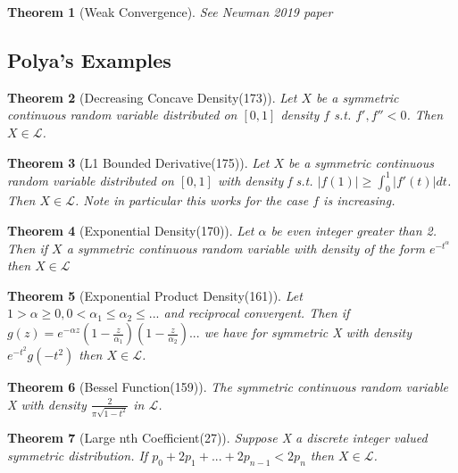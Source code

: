 \documentclass[10pt]{article}
\newcommand{\1}{\textbf{1}}
\newcommand{\lL}{\mathcal{L}}
\newtheorem{theorem}{Theorem}
\theoremstyle{remark}
\theoremstyle{definition}
\begin{document}
\begin{theorem}[Weak Convergence] \label{them:WC}
	See Newman 2019 paper
\end{theorem}

\subsection{Polya's Examples}

\begin{theorem}[Decreasing Concave Density(173)] \label{CCDNSTY}
	Let $X$ be a symmetric continuous random variable distributed on $[0,1]$ density $f$ s.t. $f',f'' < 0$. Then $X \in \lL$.
\end{theorem}

\begin{theorem}[L1 Bounded Derivative(175)] \label{LBDER}
	Let $X$ be a symmetric continuous random variable distributed on $[0,1]$ with density f s.t. $|f(1)| \geq \int_0^1 |f'(t)|dt$. Then $X \in \lL$. Note in particular this works for the case $f$ is increasing.
\end{theorem}

\begin{theorem}[Exponential Density(170)] \label{EXPDEN}
	Let $\alpha$ be even integer greater than 2. Then if $X$ a symmetric continuous random variable with density of the form $e^{-t^{\alpha}}$ then $X \in \lL$
\end{theorem}

\begin{theorem}[Exponential Product Density(161)] \label{EXPPDEN}
	Let $1 > \alpha \geq 0, 0 < \alpha_1 \leq \alpha_2 \leq ...$ and reciprocal convergent. Then if $g(z)= e^{-\alpha z} (1-\frac{z}{\alpha_1})(1-\frac{z}{\alpha_2})...$ we have for symmetric X with density $e^{-t^2} g(-t^2)$ then $X \in \lL$.
\end{theorem}

\begin{theorem}[Bessel Function(159)] \label{BF}
	The symmetric continuous random variable X with density $\frac{2}{\pi\sqrt{1-t^2}}$ in $\lL$.
\end{theorem} 

\begin{theorem}[Large nth Coefficient(27)] \label{LNC}
	Suppose X a discrete integer valued symmetric distribution. If $p_0 + 2p_1 +... + 2p_{n-1} < 2p_n$ then $X \in \lL$. 
\end{theorem}

\end{document}
